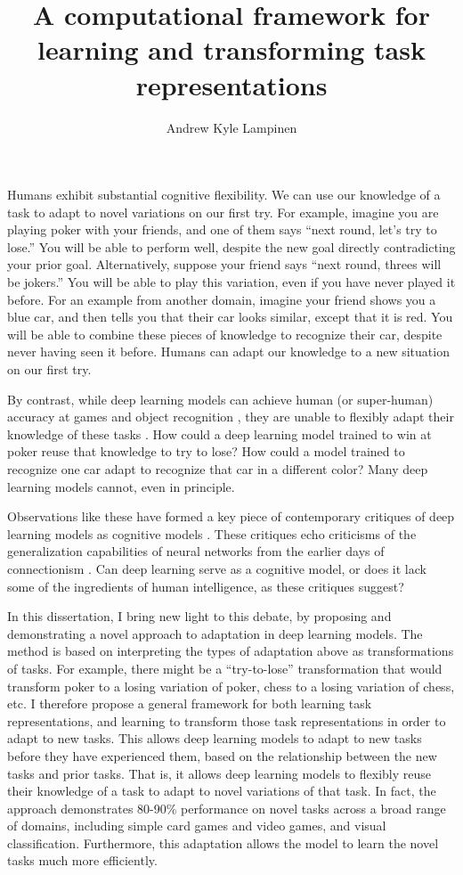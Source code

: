 \documentclass[11pt]{article}
\title{A computational framework for learning and transforming task representations}
\author{Andrew Kyle Lampinen}
\date{}
\begin{document}
\maketitle

Humans exhibit substantial cognitive flexibility. We can use our knowledge of a task to adapt to novel variations on our first try. For example, imagine you are playing poker with your friends, and one of them says ``next round, let's try to lose.'' You will be able to perform well, despite the new goal directly contradicting your prior goal. Alternatively, suppose your friend says ``next round, threes will be jokers.'' You will be able to play this variation, even if you have never played it before. For an example from another domain, imagine your friend shows you a blue car, and then tells you that their car looks similar, except that it is red. You will be able to combine these pieces of knowledge to recognize their car, despite never having seen it before. Humans can adapt our knowledge to a new situation on our first try. 

By contrast, while deep learning models can achieve human (or super-human) accuracy at games \citep{Silver2017,Vinyals2019} and object recognition \citep{Szegedy2016}, they are unable to flexibly adapt their knowledge of these tasks \citep{Lake2016}. How could a deep learning model trained to win at poker reuse that knowledge to try to lose? How could a model trained to recognize one car adapt to recognize that car in a different color? Many deep learning models cannot, even in principle.  

Observations like these have formed a key piece of contemporary critiques of deep learning models as cognitive models \citep{Lake2016,Marcus2018}. These critiques echo criticisms of the generalization capabilities of neural networks from the earlier days of connectionism \citep{Fodor1988}. Can deep learning serve as a cognitive model, or does it lack some of the ingredients of human intelligence, as these critiques suggest? 

In this dissertation, I bring new light to this debate, by proposing and demonstrating a novel approach to adaptation in deep learning models. The method is based on interpreting the types of adaptation above as transformations of tasks. For example, there might be a ``try-to-lose'' transformation that would transform poker to a losing variation of poker, chess to a losing variation of chess, etc. I therefore propose a general framework for both learning task representations, and learning to transform those task representations in order to adapt to new tasks. This allows deep learning models to adapt to new tasks before they have experienced them, based on the relationship between the new tasks and prior tasks. That is, it allows deep learning models to flexibly reuse their knowledge of a task to adapt to novel variations of that task. In fact, the approach demonstrates 80-90\% performance on novel tasks across a broad range of domains, including simple card games and video games, and visual classification. Furthermore, this adaptation allows the model to learn the novel tasks much more efficiently.  
\end{document}

